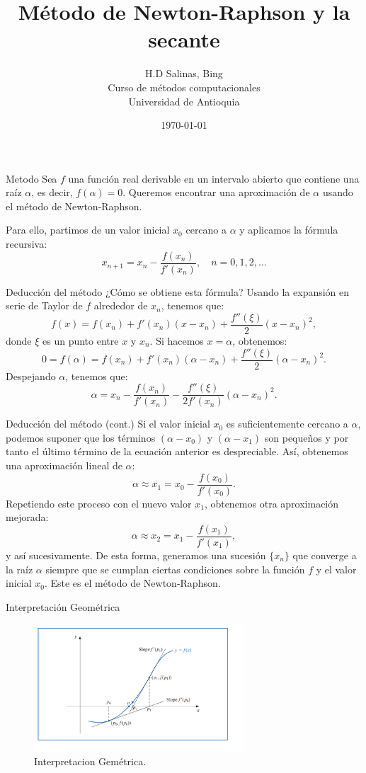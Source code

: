 \documentclass{beamer}
\title{Método de Newton-Raphson y la secante}
\author{H.D Salinas, Bing \\
Curso de métodos computacionales\\
Universidad de Antioquia\\}
\date{\today}
\begin{document}
\begin{frame}
  \titlepage
\end{frame}

\begin{frame}{Metodo }
  Sea $f$ una función real derivable en un intervalo abierto que contiene una raíz $\alpha$, es decir, $f(\alpha)=0$. Queremos encontrar una aproximación de $\alpha$ usando el método de Newton-Raphson.

Para ello, partimos de un valor inicial $x_0$ cercano a $\alpha$ y aplicamos la fórmula recursiva:
\[x_{n+1}=x_n-\frac{f(x_n)}{f'(x_n)}, \quad n=0,1,2,\dots\]
\end{frame}

\begin{frame}{Deducción del método}
¿Cómo se obtiene esta fórmula? Usando la expansión en serie de Taylor de $f$ alrededor de $x_n$, tenemos que:
\pause
\[f(x)=f(x_n)+f'(x_n)(x-x_n)+\frac{f''(\xi)}{2}(x-x_n)^2,\]
donde $\xi$ es un punto entre $x$ y $x_n$. Si hacemos 
$x=\alpha$, obtenemos:
\pause
\[0=f(\alpha)=f(x_n)+f'(x_n)(\alpha-x_n)+\frac{f''(\xi)}{2}(\alpha-x_n)^2.\]
\pause
Despejando $\alpha$, tenemos que:
\[\alpha=x_n-\frac{f(x_n)}{f'(x_n)}-\frac{f''(\xi)}{2 f'(x_n)}(\alpha-x_n)^2.\]
\end{frame}

\begin{frame}{Deducción del método (cont.)}
Si el valor inicial $x_0$ es suficientemente cercano a $\alpha$, podemos suponer que los términos $(\alpha-x_0)$ y $(\alpha-x_1)$ son pequeños y por tanto el último término de la ecuación anterior es despreciable. Así, obtenemos una aproximación lineal de $\alpha$:
\[\alpha \approx x_1=x_0-\frac{f(x_0)}{f'(x_0)}.\]
Repetiendo este proceso con el nuevo valor $x_1$, obtenemos otra aproximación mejorada:
\[\alpha \approx x_2=x_1-\frac{f(x_1)}{f'(x_1)},\]
y así sucesivamente. De esta forma, generamos una sucesión $\{x_n\}$ que converge a la raíz $\alpha$ siempre que se cumplan ciertas condiciones sobre la función $f$ y el valor inicial $x_0$. Este es el método de Newton-Raphson.
  
\end {frame}



  
\begin{frame}{Interpretación Geométrica}
\begin{figure} 
\includegraphics[width=0.7\textwidth]{NewtonRaphsod.png} \caption{Interpretacion Gemétrica.} \end{figure} 
\end{frame}
\end{document}
